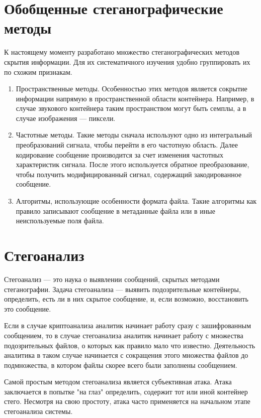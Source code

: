 \section{Обобщенные стеганографические методы}
К настоящему моменту разработано множество стеганографических методов скрытия информации.
Для их систематичного изучения удобно группировать их по схожим признакам.
\begin{enumerate}
    \item Пространственные методы. Особенностью этих методов является сокрытие информации напрямую
    в пространственной области контейнера. Например,
    в случае звукового контейнера  таким пространством могут быть семплы,
    а в случае изображения --- пиксели.
    \item Частотные методы. Такие методы сначала используют одно из интегральный преобразований сигнала,
    чтобы перейти в его частотную область. Далее кодирование сообщение производится за счет изменения частотных
    характеристик сигнала. После этого используется обратное преобразование, чтобы получить модифицированный сигнал,
    содержащий закодированное сообщение.
    \item Алгоритмы, использующие особенности формата файла. Такие алгоритмы как правило записывают
    сообщение в метаданные файла или в иные неиспользуемые поля файла.
\end{enumerate}

\section{Стегоанализ}
Стегоанализ --- это наука о выявлении сообщений, скрытых методами стеганографии.
Задача стегоанализа --- выявить подозрительные контейнеры, определить, есть ли в них скрытое сообщение,
и, если возможно, восстановить это сообщение.

Если в случае криптоанализа аналитик начинает работу сразу с зашифрованным сообщением,
то в случае стегоанализа аналитик начинает работу с множества подозрительных файлов,
о которых как правило мало что известно. Деятельность аналитика в таком случае
начинается с сокращения этого множества файлов до подмножества, в котором файлы
скорее всего были заполнены сообщением.

Самой простым методом стегоанализа является субъективная атака. Атака заключается
в попытке "на глаз" определить, содержит тот или иной контейнер стего. Несмотря
на свою простоту, атака часто применяется на начальном этапе стегоанализа системы.

